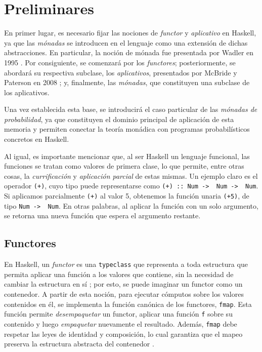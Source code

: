 \section{Preliminares}

En primer lugar, es necesario fijar las nociones de \textit{functor} y \textit{aplicativo} en \textsf{Haskell}, ya que las \textit{mónadas} se introducen en el lenguaje como una extensión de dichas abstracciones. En particular, la noción de mónada fue presentada por Wadler en 1995 \cite{Wadler1995}. Por consiguiente, se comenzará por los \textit{functores}; posteriormente, se abordará su respectiva subclase, los \textit{aplicativos}, presentados por McBride y Paterson en 2008 \cite{McBride2008}; y, finalmente, las \textit{mónadas}, que constituyen una subclase de los aplicativos. 

Una vez establecida esta base, se introducirá el caso particular de las \textit{mónadas de probabilidad}, ya que constituyen el dominio principal de aplicación de esta memoria y permiten conectar la teoría monádica con programas probabilísticos concretos en \textsf{Haskell}.

Al igual, es importante mencionar que, al ser \textsf{Haskell} un lenguaje funcional, las funciones se tratan como valores de primera clase, lo que permite, entre otras cosas, la \emph{currificación} y \emph{aplicación parcial} de estas mismas. Un ejemplo claro es el operador \texttt{(+)}, cuyo tipo puede representarse como \texttt{(+) :: Num -> \ Num -> \ Num}. Si aplicamos parcialmente \texttt{(+)} al valor 5, obtenemos la función unaria \texttt{(+5)}, de tipo \texttt{Num -> \ Num}. En otras palabras, al aplicar la función con un solo argumento, se retorna una nueva función que espera el argumento restante.

\subsection{Functores}

En \textsf{Haskell}, un \textit{functor} es una \verb|typeclass| que representa a toda estructura que permita aplicar una función a los valores que contiene, sin la necesidad de cambiar la estructura en sí \cite{Yorgey2009}; por esto, se puede imaginar un functor como un contenedor. A partir de esta noción, para ejecutar cómputos sobre los valores contenidos en él, se implementa la función canónica de los functores, \texttt{fmap}. Esta función permite \textit{desempaquetar} un functor, aplicar una función \texttt{f} sobre su contenido y luego \textit{empaquetar} nuevamente el resultado. Además, \texttt{fmap} debe respetar las leyes de identidad y composición, lo cual garantiza que el mapeo preserva la estructura abstracta del contenedor \cite{Yorgey2009}.

